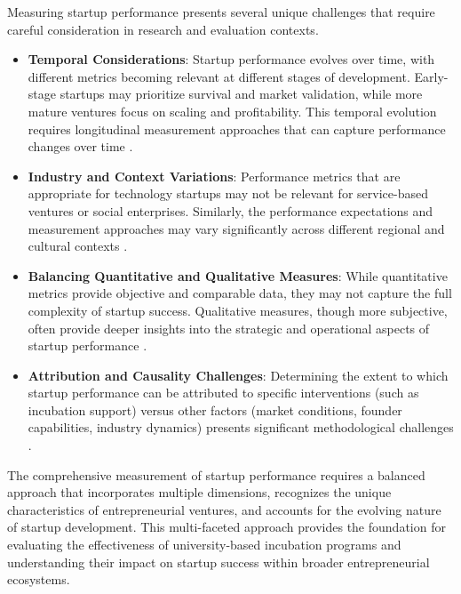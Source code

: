 \documentclass[../Main.tex]{subfiles}
\begin{document}
Measuring startup performance presents several unique challenges that require careful consideration in research and evaluation contexts.

\begin{itemize}
    \item \textbf{Temporal Considerations}: Startup performance evolves over time, with different metrics becoming relevant at different stages of development. Early-stage startups may prioritize survival and market validation, while more mature ventures focus on scaling and profitability. This temporal evolution requires longitudinal measurement approaches that can capture performance changes over time \cite{Chan2005Assessing}.
    
    \item \textbf{Industry and Context Variations}: Performance metrics that are appropriate for technology startups may not be relevant for service-based ventures or social enterprises. Similarly, the performance expectations and measurement approaches may vary significantly across different regional and cultural contexts \cite{spigel2017relational}.
    
    \item \textbf{Balancing Quantitative and Qualitative Measures}: While quantitative metrics provide objective and comparable data, they may not capture the full complexity of startup success. Qualitative measures, though more subjective, often provide deeper insights into the strategic and operational aspects of startup performance \cite{patton2014realising}.
    
    \item \textbf{Attribution and Causality Challenges}: Determining the extent to which startup performance can be attributed to specific interventions (such as incubation support) versus other factors (market conditions, founder capabilities, industry dynamics) presents significant methodological challenges \cite{barbero2012revisiting}.
\end{itemize}

The comprehensive measurement of startup performance requires a balanced approach that incorporates multiple dimensions, recognizes the unique characteristics of entrepreneurial ventures, and accounts for the evolving nature of startup development. This multi-faceted approach provides the foundation for evaluating the effectiveness of university-based incubation programs and understanding their impact on startup success within broader entrepreneurial ecosystems.
\end{document}
